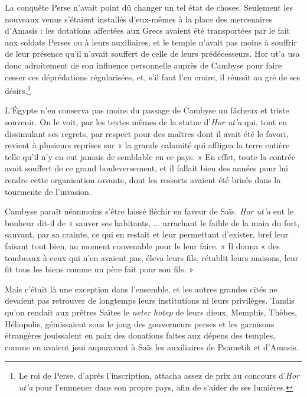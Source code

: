 \documentclass[letterpaper,twocolumn,openany,nodeprecatedcode]{dndbook}
\begin{document}
La conquête Perse n'avait point dû changer un tel état de choses. Seulement les nouveaux venus s'étaient installés d'eux-mêmes à la place des mercenaires d'Amasis : les dotations affectées aux Grecs avaient été transportées par le fait aux soldats Perses ou à leurs auxiliaires, et le temple n'avait pas moins à souffrir de leur présence qu'il n'avait souffert de celle de leurs prédécesseurs. Hor ut'a usa donc adroitement de son influence personnelle auprès de Cambyse pour faire cesser ces déprédations régularisées, et, s'il faut l'en croire, il réussit au gré de ses désirs.\footnote{Le roi de Perse, d'après l'inscription, attacha assez de prix au concours d'\emph{Hor ut'a} pour l'emmener dans son propre pays, afin de s'aider de ses lumières.}

L'Égypte n'en conserva pas moins du passage de Cambyse un fâcheux et triste souvenir. On le voit, par les textes mêmes de la statue d'\emph{Hor ut'a} qui, tout en dissimulant ses regrets, par respect pour des maîtres dont il avait été le favori, revient à plusieurs reprises sur « la grande calamité qui affligea la terre entière telle qu'il n'y en eut jamais de semblable en ce pays. » En effet, toute la contrée avait souffert de ce grand bouleversement, et il fallait bien des années pour lui rendre cette organisation savante, dont les ressorts avaient été brisés dans la tourmente de l'invasion.

Cambyse paraît néanmoins s'être laissé fléchir en faveur de Saïs. \emph{Hor ut'a} eut le bonheur dit-il de « sauver ses habitants, ... arrachant le faible de la main du fort, sauvant, par sa crainte, ce qui en restait et leur permettant d'exister, bref leur faisant tout bien, au moment convenable pour le leur faire. » Il donna « des tombeaux à ceux qui n'en avaient pas, éleva leurs fils, rétablit leurs maisons, leur fit tous les biens comme un père fait pour son fils. »

Mais c'était là une exception dans l'ensemble, et les autres grandes cités ne devaient pas retrouver de longtemps leurs institutions ni leurs privilèges. Tandis qu'on rendait aux prêtres Saïtes le \emph{neter hotep} de leurs dieux, Memphis, Thèbes, Héliopolis, gémissaient sous le joug des gouverneurs perses et les garnisons étrangères jouissaient en paix des donations faites aux dépens des temples, comme en avaient joui auparavant à Saïs les auxiliaires de Psametik et d'Amasis.
\end{document}
